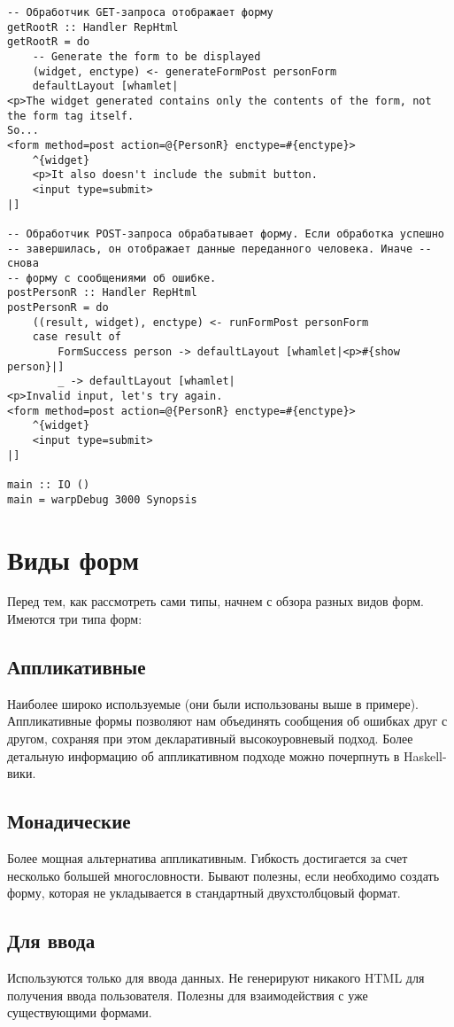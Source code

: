 \begin{lstlisting}
-- Обработчик GET-запроса отображает форму
getRootR :: Handler RepHtml
getRootR = do
    -- Generate the form to be displayed
    (widget, enctype) <- generateFormPost personForm
    defaultLayout [whamlet|
<p>The widget generated contains only the contents of the form, not the form tag itself.
So...
<form method=post action=@{PersonR} enctype=#{enctype}>
    ^{widget}
    <p>It also doesn't include the submit button.
    <input type=submit>
|]

-- Обработчик POST-запроса обрабатывает форму. Если обработка успешно 
-- завершилась, он отображает данные переданного человека. Иначе -- снова
-- форму с сообщениями об ошибке.
postPersonR :: Handler RepHtml
postPersonR = do
    ((result, widget), enctype) <- runFormPost personForm
    case result of
        FormSuccess person -> defaultLayout [whamlet|<p>#{show person}|]
        _ -> defaultLayout [whamlet|
<p>Invalid input, let's try again.
<form method=post action=@{PersonR} enctype=#{enctype}>
    ^{widget}
    <input type=submit>
|]

main :: IO ()
main = warpDebug 3000 Synopsis
\end{lstlisting}

\section{Виды форм}

Перед тем, как рассмотреть сами типы, начнем с обзора разных видов форм. Имеются три типа
форм:

\subsection{Аппликативные}
Наиболее широко используемые (они были использованы выше в примере). Аппликативные формы
позволяют нам объединять сообщения об ошибках друг с другом, сохраняя при этом
декларативный высокоуровневый подход. Более детальную информацию об аппликативном подходе
можно почерпнуть в Haskell-вики.

\subsection{Монадические}
Более мощная альтернатива аппликативным. Гибкость достигается за счет несколько большей
многословности. Бывают полезны, если необходимо создать форму, которая не укладывается в
стандартный двухстолбцовый формат.

\subsection{Для ввода}
Используются только для ввода данных. Не генерируют никакого HTML для получения ввода
пользователя. Полезны для взаимодействия с уже существующими формами.

